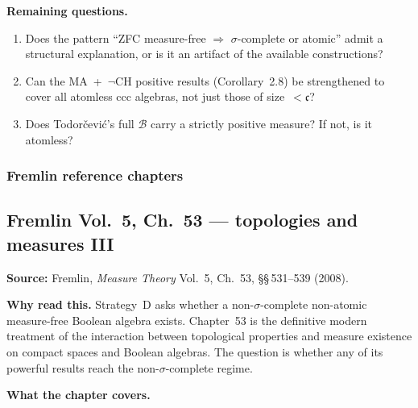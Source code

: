 \medskip\noindent
\textbf{Remaining questions.}
\begin{enumerate}[nosep]
  \item Does the pattern ``ZFC measure-free $\Rightarrow$
    $\sigma$-complete or atomic'' admit a structural explanation,
    or is it an artifact of the available constructions?
  \item Can the MA~+~$\neg$CH positive results (Corollary~2.8) be
    strengthened to cover all atomless ccc algebras, not just those
    of size~$< \mathfrak{c}$?
  \item Does Todor\v{c}evi\'{c}'s full $\mathcal{B}$ carry a
    strictly positive measure?  If not, is it atomless?
\end{enumerate}

\subsubsection{Fremlin reference chapters}

\subsection*{Fremlin Vol.~5, Ch.~53 --- topologies and measures III}

\textbf{Source:} Fremlin, \emph{Measure Theory} Vol.~5, Ch.~53,
\S\S\,531--539 (2008).

\textbf{Why read this.}  Strategy~D asks whether a non-$\sigma$-complete
non-atomic measure-free Boolean algebra exists.  Chapter~53 is the
definitive modern treatment of the interaction between topological
properties and measure existence on compact spaces and Boolean algebras.
The question is whether any of its powerful results reach the
non-$\sigma$-complete regime.

\textbf{What the chapter covers.}

